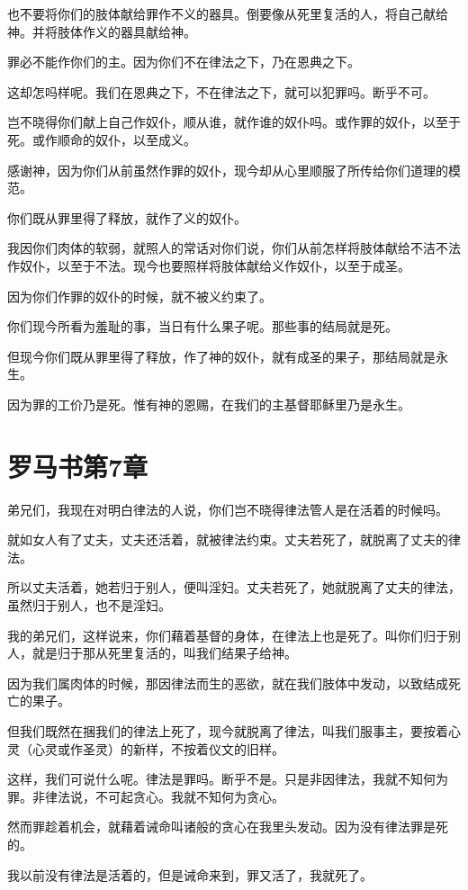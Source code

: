 \documentclass[12pt,oneside]{book}
\begin{document}
也不要将你们的肢体献给罪作不义的器具。倒要像从死里复活的人，将自己献给神。并将肢体作义的器具献给神。

罪必不能作你们的主。因为你们不在律法之下，乃在恩典之下。

这却怎吗样呢。我们在恩典之下，不在律法之下，就可以犯罪吗。断乎不可。

岂不晓得你们献上自己作奴仆，顺从谁，就作谁的奴仆吗。或作罪的奴仆，以至于死。或作顺命的奴仆，以至成义。

感谢神，因为你们从前虽然作罪的奴仆，现今却从心里顺服了所传给你们道理的模范。

你们既从罪里得了释放，就作了义的奴仆。

我因你们肉体的软弱，就照人的常话对你们说，你们从前怎样将肢体献给不洁不法作奴仆，以至于不法。现今也要照样将肢体献给义作奴仆，以至于成圣。

因为你们作罪的奴仆的时候，就不被义约束了。

你们现今所看为羞耻的事，当日有什么果子呢。那些事的结局就是死。

但现今你们既从罪里得了释放，作了神的奴仆，就有成圣的果子，那结局就是永生。

因为罪的工价乃是死。惟有神的恩赐，在我们的主基督耶稣里乃是永生。

\chapter{罗马书第7章}
弟兄们，我现在对明白律法的人说，你们岂不晓得律法管人是在活着的时候吗。

就如女人有了丈夫，丈夫还活着，就被律法约束。丈夫若死了，就脱离了丈夫的律法。

所以丈夫活着，她若归于别人，便叫淫妇。丈夫若死了，她就脱离了丈夫的律法，虽然归于别人，也不是淫妇。

我的弟兄们，这样说来，你们藉着基督的身体，在律法上也是死了。叫你们归于别人，就是归于那从死里复活的，叫我们结果子给神。

因为我们属肉体的时候，那因律法而生的恶欲，就在我们肢体中发动，以致结成死亡的果子。

但我们既然在捆我们的律法上死了，现今就脱离了律法，叫我们服事主，要按着心灵（心灵或作圣灵）的新样，不按着仪文的旧样。

这样，我们可说什么呢。律法是罪吗。断乎不是。只是非因律法，我就不知何为罪。非律法说，不可起贪心。我就不知何为贪心。

然而罪趁着机会，就藉着诫命叫诸般的贪心在我里头发动。因为没有律法罪是死的。

我以前没有律法是活着的，但是诫命来到，罪又活了，我就死了。
\end{document}
